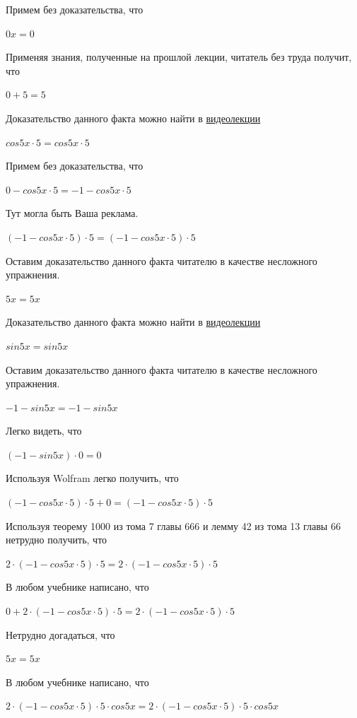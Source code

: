 \documentclass[12pt,a4paper,fleqn]{article}
\theoremstyle{definition}
\begin{document}
Примем без доказательства, что 

$ 0  x  =  0 $

Применяя знания, полученные на прошлой лекции, читатель без труда получит, что 

$ 0  +  5  =  5 $

Доказательство данного факта можно найти в \href{https://www.youtube.com/watch?v=dQw4w9WgXcQ}{видеолекции} 

$cos 5  x  \cdot  5  = cos 5  x  \cdot  5 $

Примем без доказательства, что 

$ 0  - cos 5  x  \cdot  5  =  -1  - cos 5  x  \cdot  5 $

Тут могла быть Ваша реклама. 

$( -1  - cos 5  x  \cdot  5 ) \cdot  5  = ( -1  - cos 5  x  \cdot  5 ) \cdot  5 $

Оставим доказательство данного факта читателю в качестве несложного упражнения. 

$ 5  x  =  5  x $

Доказательство данного факта можно найти в \href{https://www.youtube.com/watch?v=dQw4w9WgXcQ}{видеолекции} 

$sin 5  x  = sin 5  x $

Оставим доказательство данного факта читателю в качестве несложного упражнения. 

$ -1  - sin 5  x  =  -1  - sin 5  x $

Легко видеть, что 

$( -1  - sin 5  x ) \cdot  0  =  0 $

Используя Wolfram легко получить, что 

$( -1  - cos 5  x  \cdot  5 ) \cdot  5  +  0  = ( -1  - cos 5  x  \cdot  5 ) \cdot  5 $

Используя теорему 1000 из тома 7 главы 666 и лемму 42 из тома 13 главы 66 нетрудно получить, что 

$ 2  \cdot ( -1  - cos 5  x  \cdot  5 ) \cdot  5  =  2  \cdot ( -1  - cos 5  x  \cdot  5 ) \cdot  5 $

В любом учебнике написано, что 

$ 0  +  2  \cdot ( -1  - cos 5  x  \cdot  5 ) \cdot  5  =  2  \cdot ( -1  - cos 5  x  \cdot  5 ) \cdot  5 $

Нетрудно догадаться, что 

$ 5  x  =  5  x $

В любом учебнике написано, что 

$ 2  \cdot ( -1  - cos 5  x  \cdot  5 ) \cdot  5  \cdot cos 5  x  =  2  \cdot ( -1  - cos 5  x  \cdot  5 ) \cdot  5  \cdot cos 5  x $
\end{document}
